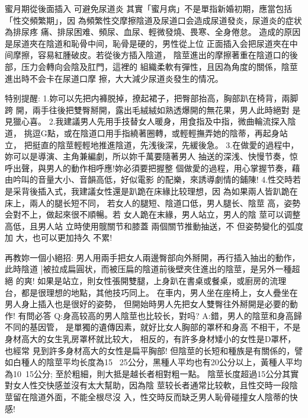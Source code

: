 \documentclass[12pt,UTF8]{ctexbook}
\begin{document}
蜜月期從後面插入
可避免尿道炎
其實「蜜月病」不是單指新婚初期，應當包括「性交頻繁期」，因
為頻繁性交摩擦陰道及尿道口会造成尿道發炎，尿道炎的症状為排尿疼
痛、排尿困难、頻尿、血尿、輕微發燒、畏寒、全身倦怠。
造成的原因是尿道夾在陰道和恥骨中间，恥骨是硬的，男性從上位
正面插入会把尿道夾在中间摩擦，容易紅腫破皮。若從後方插入陰道，
陰莖進出的摩擦著重在陰道口的後部，压力会轉向会陰及肛門，這裡的
組織柔軟有彈性，且因為角度的關係，陰莖進出時不会卡在尿道口摩
擦，大大減少尿道炎發生的情况。

特别提醒:
1.妳可以先把内褲脱掉，撩起裙子，把臀部抬高，胸部趴在椅背，兩脚跨
開，兩手往後把雙臀掰開，露出毛絨絨如熟透爆開的無花果，男人此時絕對
是見獵心喜。
2.我建議男人先用手技替女人暖身，用食指及中指，微曲輪流探入陰道，
挑逗G點，或在陰道口用手指繞著圈轉，或輕輕撫弄她的陰蒂，再起身站立，
把挺直的陰莖輕輕地推進陰道，先浅後深，先緩後急。
3.在做愛的過程中，妳可以是導演、主角兼編劇，所以妳千萬要隨著男人
抽送的深浅、快慢节奏，惊呼出聲，與男人的動作相呼應!妳必須要把握整
個做愛的過程，用心掌握节奏，藉由吟叫的音量大小、音韻高低，好似電影
的配樂，來誘導劇情的鋪陳!
4.性交時若是采背後插入式，我建議女性還是趴跪在床緣比较理想，因
為如果兩人皆趴跪在床上，兩人的腿长短不同，
若女人的腿短、陰道口低，男人腿长、陰莖
高，姿勢会對不上，做起來很不順暢。若
女人跪在末緣，男人站立，男人的陰
莖可以调整高低，且男人站
立時使用髋關节和膝蓋
兩個關节推動抽送，不
但姿勢變化的弧度加
大，也可以更加持久
不累!

再教妳一個小絕招:
男人用兩手把女人兩邊臀部向外掰開，再行插入抽出的動作，此時陰道
]被拉成扁圓状，而被压扁的陰道前後壁夾住進出的陰莖，是另外一種超絕
的爽!
如果是站立，則女性張開雙腿，上身趴在書桌或餐桌，或廚房的流理
台，都是很理想的地點，其他技巧同上。
在車内，男人坐在座椅上，女人疊坐在男人身上插入也是很好的姿勢，
但開始時男人先把女人雙臀往外掰開是必要的動作!
有問必答
Q:身高较高的男人陰莖也比较长，對吗?
A:錯，男人的陰莖和身高歸不同的基因管，
是單獨的遺傳因素，就好比女人胸部的罩杯和身高
不相干，不是身材高大的女生乳房罩杯就比较大，
相反的，有許多身材矮小的女性是D罩杯，也經常
見到許多身材高大的女性是扁平胸部!
但陰莖的长短和種族是有關係的，譬如白種人的陰莖平均长度為15
~25公分，黑種人平均也有20公分以上，黃種人平均為10~15公分;
至於粗細，則大抵是越长者相對粗一點。
陰莖长度超過15公分其實對女人性交快感並沒有太大幫助，因為陰
莖较长者通常比较軟，且性交時一段陰莖留在陰道外面，不能全根尽沒
入，性交時反而缺乏男人恥骨碰撞女人陰蒂的快感!
\end{document}
